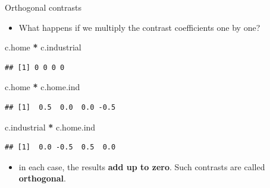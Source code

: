 \documentclass[
  ignorenonframetext,
]{beamer}
\newenvironment{Shaded}{\begin{snugshade}}{\end{snugshade}}
\newcommand{\NormalTok}[1]{#1}
\newcommand{\OperatorTok}[1]{\textcolor[rgb]{0.81,0.36,0.00}{\textbf{#1}}}
\newcommand{\StringTok}[1]{\textcolor[rgb]{0.31,0.60,0.02}{#1}}
\providecommand{\tightlist}{%
  \setlength{\itemsep}{0pt}\setlength{\parskip}{0pt}}
\begin{document}
\begin{frame}[fragile]{Orthogonal contrasts}
\protect\hypertarget{orthogonal-contrasts}{}

\begin{itemize}
\tightlist
\item
  What happens if we multiply the contrast coefficients one by one?
\end{itemize}

\begin{Shaded}
\begin{Highlighting}[]
\NormalTok{c.home }\OperatorTok{*}\StringTok{ }\NormalTok{c.industrial}
\end{Highlighting}
\end{Shaded}

\begin{verbatim}
## [1] 0 0 0 0
\end{verbatim}

\begin{Shaded}
\begin{Highlighting}[]
\NormalTok{c.home }\OperatorTok{*}\StringTok{ }\NormalTok{c.home.ind}
\end{Highlighting}
\end{Shaded}

\begin{verbatim}
## [1]  0.5  0.0  0.0 -0.5
\end{verbatim}

\begin{Shaded}
\begin{Highlighting}[]
\NormalTok{c.industrial }\OperatorTok{*}\StringTok{ }\NormalTok{c.home.ind}
\end{Highlighting}
\end{Shaded}

\begin{verbatim}
## [1]  0.0 -0.5  0.5  0.0
\end{verbatim}

\begin{itemize}
\tightlist
\item
  in each case, the results \textbf{add up to zero}. Such contrasts are
  called \textbf{orthogonal}.
\end{itemize}

\end{frame}
\end{document}
